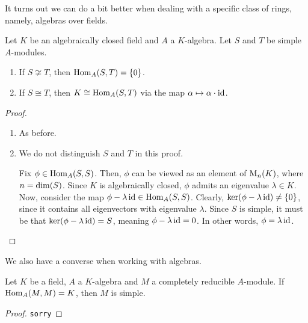 It turns out we can do a bit better when dealing with a specific class of rings, namely, algebras over fields.

\begin{theorem}\label{Ch1:Thm:Schur_Algebra}
    Let $K$ be an algebraically closed field and $A$ a $K$-algebra. Let $S$ and $T$ be simple $A$-modules.
    \begin{enumerate}[label = \normalfont \arabic*., noitemsep]
        \item If $S \not\cong T$, then $\operatorname{Hom}_A(S, T) = \left\{ 0 \right\}$.
        \item If $S \cong T$, then $K \cong \operatorname{Hom}_A(S, T)$ via the map $\alpha \mapsto \alpha \cdot \operatorname{id}$.
    \end{enumerate}
\end{theorem}
\begin{proof}
    \hfill
    \begin{enumerate}
        \item As before.
        \item We do not distinguish $S$ and $T$ in this proof.
        
        Fix $\phi \in \operatorname{Hom}_A(S,S)$. Then, $\phi$ can be viewed as an element of $\operatorname{M}_{n}\!\left( K \right)$, where $n = \dim\!\left( S \right)$. Since $K$ is algebraically closed, $\phi$ admits an eigenvalue $\lambda \in K$. Now, consider the map $\phi - \lambda \operatorname{id} \in \operatorname{Hom}_A(S,S)$. Clearly, $\operatorname{ker}\!\left( \phi - \lambda \operatorname{id} \right) \neq \left\{ 0 \right\}$, since it contains all eigenvectors with eigenvalue $\lambda$. Since $S$ is simple, it must be that $\operatorname{ker}\!\left( \phi - \lambda \operatorname{id} \right) = S$, meaning $\phi - \lambda \operatorname{id} = 0$. In other words, $\phi = \lambda \operatorname{id}$.  %
    \end{enumerate}
\end{proof}

We also have a converse when working with algebras.

\begin{theorem}\label{Ch1:Thm:Schur_Algebra_Converse}
    Let $K$ be a field, $A$ a $K$-algebra and $M$ a completely reducible $A$-module. If $\operatorname{Hom}_A(M,M) = K$, then $M$ is simple.
\end{theorem}
\begin{proof}
    \verb|sorry|
\end{proof}

